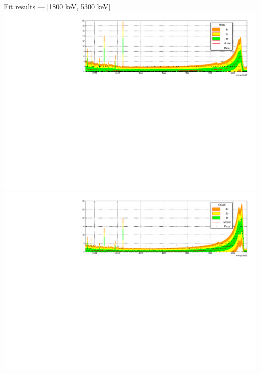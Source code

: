 \documentclass[10pt]{beamer}
\begin{document}
\begin{frame}{Fit results --- [1800 keV, 5300 keV]}
	\centering\includegraphics[height=\textwidth, angle=270]{img/BEGealpha.pdf} \\
	\centering\includegraphics[height=\textwidth, angle=270]{img/COAXalpha.pdf}
\end{frame}
\end{document}

